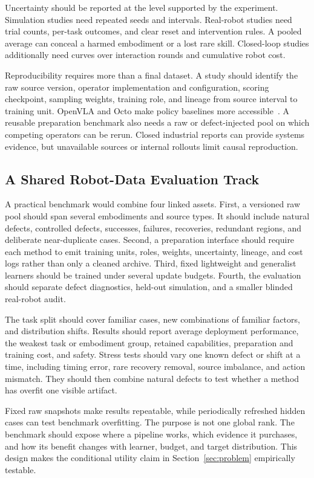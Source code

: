 Uncertainty should be reported at the level supported by the experiment. Simulation studies need repeated seeds and intervals. Real-robot studies need trial counts, per-task outcomes, and clear reset and intervention rules. A pooled average can conceal a harmed embodiment or a lost rare skill. Closed-loop studies additionally need curves over interaction rounds and cumulative robot cost.

Reproducibility requires more than a final dataset. A study should identify the raw source version, operator implementation and configuration, scoring checkpoint, sampling weights, training role, and lineage from source interval to training unit. OpenVLA and Octo make policy baselines more accessible~\cite{kim2024openvla_2406_09246,team2024octo_2405_12213}. A reusable preparation benchmark also needs a raw or defect-injected pool on which competing operators can be rerun. Closed industrial reports can provide systems evidence, but unavailable sources or internal rollouts limit causal reproduction.

\subsection{A Shared Robot-Data Evaluation Track}

A practical benchmark would combine four linked assets. First, a versioned raw pool should span several embodiments and source types. It should include natural defects, controlled defects, successes, failures, recoveries, redundant regions, and deliberate near-duplicate cases. Second, a preparation interface should require each method to emit training units, roles, weights, uncertainty, lineage, and cost logs rather than only a cleaned archive. Third, fixed lightweight and generalist learners should be trained under several update budgets. Fourth, the evaluation should separate defect diagnostics, held-out simulation, and a smaller blinded real-robot audit.

The task split should cover familiar cases, new combinations of familiar factors, and distribution shifts. Results should report average deployment performance, the weakest task or embodiment group, retained capabilities, preparation and training cost, and safety. Stress tests should vary one known defect or shift at a time, including timing error, rare recovery removal, source imbalance, and action mismatch. They should then combine natural defects to test whether a method has overfit one visible artifact.

Fixed raw snapshots make results repeatable, while periodically refreshed hidden cases can test benchmark overfitting. The purpose is not one global rank. The benchmark should expose where a pipeline works, which evidence it purchases, and how its benefit changes with learner, budget, and target distribution. This design makes the conditional utility claim in Section~\ref{sec:problem} empirically testable.

